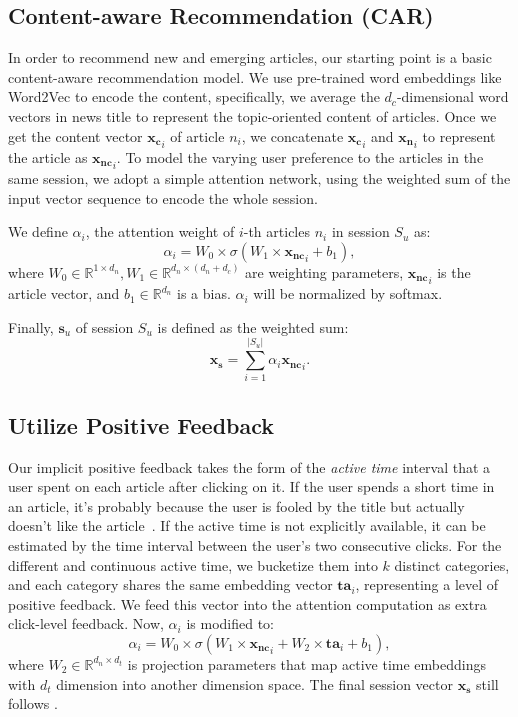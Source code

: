 \subsection{Content-aware Recommendation (CAR)}
In order to recommend new and emerging articles,
our starting point is a basic content-aware recommendation model. 
We use pre-trained word embeddings like Word2Vec to encode the content, specifically, we average the $d_c$-dimensional word vectors in news title to represent the 
topic-oriented content of articles. Once we get the content vector $\mathbf{x_c}_i$ of 
article $n_i$, we concatenate $\mathbf{x_c}_i$ and $\mathbf{x_n}_i$ to represent 
the article as $\mathbf{x_{nc}}_i$. 
To model the varying user preference to the articles in the same session, we adopt a simple attention network, using the weighted sum of the input vector sequence to encode the whole session.

We define $\alpha_i$, the attention weight of $i$-th articles $n_i$ in session $S_u$ as:
\begin{equation}
    \alpha_i = W_0 \times \sigma (W_1 \times \mathbf{x_{nc}}_i +  b_1),
\end{equation}
where $W_0\in \mathbb{R}^{1 \times d_n}, W_1 \in \mathbb{R}^{d_n\times (d_n+d_c)}$ 
are weighting parameters, $\mathbf{x_{nc}}_i$ is the article vector, 
and $b_1\in \mathbb{R}^{d_n}$ is a bias. $\alpha_i$ will be normalized by softmax.

Finally, $\mathbf{s}_u$ of session $S_u$ is defined as the weighted sum:
\begin{equation}
    \label{eq:final_repre}
    \mathbf{x_s} = \sum_{i=1}^{|S_u|} \alpha_i \mathbf{x_{nc}}_i.
\end{equation}

\subsection{Utilize Positive Feedback}
\label{sec:positive feedback}
Our implicit positive feedback takes the form of the \textit{active time} interval that 
a user spent on each article after clicking on it. If the user spends a short time 
in an article, it's probably because the user is fooled by the title but actually doesn't like 
the article~\cite{lu_quality_2019}. If the active time is not explicitly available, 
it can be estimated by the time interval between the user's two consecutive clicks. 
For the different and continuous active time, we bucketize them into $k$ distinct categories, 
and each category shares the same embedding vector $\mathbf{ta}_i$, representing a level of positive feedback. We feed this vector into the attention computation as extra click-level 
feedback. Now, $\alpha_i$ is modified to:
\begin{equation}
    \alpha_i = W_0 \times \sigma (W_1 \times \mathbf{x_{nc}}_i + W_2 \times \mathbf{ta}_i + b_1),
\end{equation}
where $W_2 \in \mathbb{R}^{d_n \times d_t}$ is projection parameters that map active time embeddings with $d_t$ dimension into another dimension space. The final session vector $\mathbf{x_s}$ still follows
.

